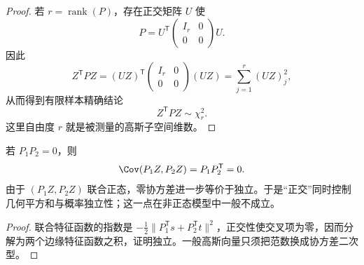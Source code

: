 \begin{proof}
若 $r=\operatorname{rank}(P)$，存在正交矩阵 $U$ 使
\[
 P=U^{\mathsf T}
 \begin{pmatrix}
 I_r&0\\
 0&0
 \end{pmatrix}U.
\]
因此
\[
 Z^{\mathsf T}PZ
 =(UZ)^{\mathsf T}
 \begin{pmatrix}
 I_r&0\\
 0&0
 \end{pmatrix}(UZ)
 =\sum_{j=1}^r(UZ)_j^2,
\]
从而得到有限样本精确结论
\begin{equation*}Z^{\mathsf T}PZ\sim\chi^2_r.
\end{equation*}
这里自由度 $r$ 就是被测量的高斯子空间维数。
\end{proof}

\begin{proposition}[正交高斯投影的独立性]
若 $P_1P_2=0$，则
\[
 \Cov(P_1Z,P_2Z)
 =P_1P_2^{\mathsf T}=0.
\]
由于 $(P_1Z,P_2Z)$ 联合正态，零协方差进一步等价于独立。于是“正交”同时控制几何平方和与概率独立性；这一点在非正态模型中一般不成立。
\end{proposition}
\begin{proof}
联合特征函数的指数是 $-\tfrac12\|P_1^{\mathsf T}s+P_2^{\mathsf T}t\|^2$，正交性使交叉项为零，因而分解为两个边缘特征函数之积，证明独立。一般高斯向量只须把范数换成协方差二次型。
\end{proof}


